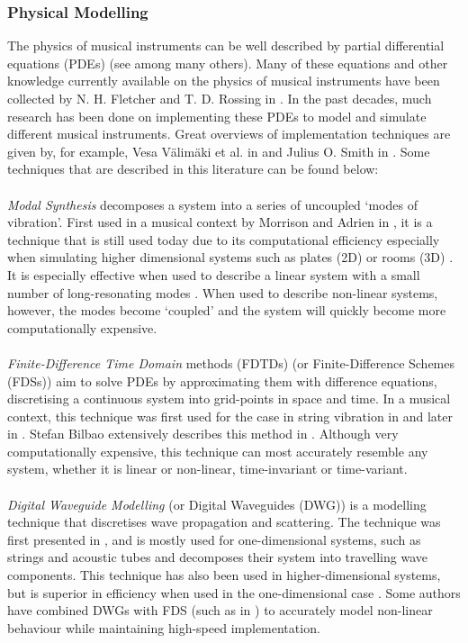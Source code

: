\subsubsection*{Physical Modelling}
The physics of musical instruments can be well described by partial differential equations (PDEs) (see \cite{Bilbao2009} among many others). Many of these equations and other knowledge currently available on the physics of musical instruments have been collected by N. H. Fletcher and T. D. Rossing in \cite{Fletcher1998}. In the past decades, much research has been done on implementing these PDEs to model and simulate different musical instruments. Great overviews of implementation techniques are given by, for example, Vesa Välimäki et al. in \cite{Valimaki2006} and Julius O. Smith in \cite{Smith2010a, Smith2010b}. Some techniques that are described in this literature can be found below:
\\
\\
\emph{Modal Synthesis} decomposes a system into a series of uncoupled ‘modes of vibration’. First used in a musical context by Morrison and Adrien in \cite{Morrison1993}, it is a technique that is still used today due to its computational efficiency especially when simulating higher dimensional systems such as plates (2D) or rooms (3D) . It is especially effective when used to describe a linear system \cite{Bilbao2018} with a small number of long-resonating modes \cite{Smith2010a}. When used to describe non-linear systems, however, the modes become `coupled’ and the system will quickly become more computationally expensive. 
\\
\\
\emph{Finite-Difference Time Domain} methods (FDTDs) (or Finite-Difference Schemes (FDSs)) aim to solve PDEs by approximating them with difference equations, discretising a continuous system into grid-points in space and time. In a musical context, this technique was first used for the case in string vibration in \cite{Ruiz1969, Hiller1971I, Hiller1971II} and later in \cite{Chaigne1992, Chaigne1994}. Stefan Bilbao extensively describes this method in \cite{Bilbao2009, Bilbao2018}. Although very computationally expensive, this technique can most accurately resemble any system, whether it is linear or non-linear, time-invariant or time-variant.
\\
\\
\emph{Digital Waveguide Modelling} (or Digital Waveguides (DWG)) is a modelling technique that discretises wave propagation and scattering. The technique was first presented in \cite{Smith1992}, and is mostly used for one-dimensional systems, such as strings and acoustic tubes and decomposes their system into travelling wave components. This technique has also been used in higher-dimensional systems, but is superior in efficiency when used in the one-dimensional case \cite{Valimaki2006}. Some authors have combined DWGs with FDS (such as in \cite{Erkut2002, Maestre2014}) to accurately model non-linear behaviour while maintaining high-speed implementation.

